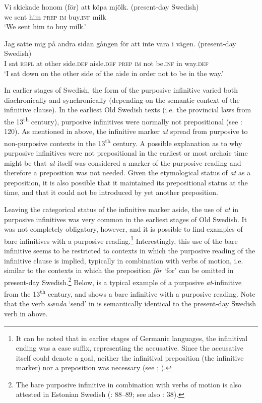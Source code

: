 \documentclass[output=paper]{langscibook}
\begin{document}
\ea
\label{ex:kalm:8}
\ea \label{ex:kalm:8a}
\gll Vi skickade honom (för) att köpa mjölk. (present-day Swedish)\\
we sent him \textsc{prep} \textsc{im} buy.\textsc{inf} milk\\
\glt ‘We sent him to buy milk.’

\ex  \label{ex:kalm:8b}
\gll Jag satte mig på andra sidan gången för att inte vara i vägen. (present-day Swedish)\\
 I sat \textsc{refl} at other side.\textsc{def} aisle.\textsc{def} \textsc{prep} \textsc{im} not be.\textsc{inf} in way.\textsc{def}\\
\glt ‘I sat down on the other side of the aisle in order not to be in the way.’
\z 
\z 


In earlier stages of Swedish, the form of the purposive infinitive varied both diachronically and synchronically (depending on the semantic context of the infinitive clause). In the earliest Old Swedish texts (i.e. the provincial laws from the 13\textsuperscript{th} century), purposive infinitives were normally not prepositional (see \citealt{Kalm2016Satsekvivalenta}: 120). As mentioned in  above, the infinitive marker \textit{at} spread from purposive to non-purposive contexts in the 13\textsuperscript{th} century. A possible explanation as to why purposive infinitives were not prepositional in the earliest or most archaic time might be that \textit{at} itself was considered a marker of the purposive reading and therefore a preposition was not needed. Given the etymological status of \textit{at} as a preposition, it is also possible that it maintained its prepositional status at the time, and that it could not be introduced by yet another preposition. 



Leaving the categorical status of the infinitive marker aside, the use of \textit{at} in purposive infinitives was very common in the earliest stages of Old Swedish. It was not completely obligatory, however, and it is possible to find examples of bare infinitives with a purposive reading.\footnote{It can be noted that in earlier stages of Germanic languages, the infinitival ending was a case suffix, representing the accusative. Since the accusative itself could denote a goal, neither the infinitival preposition (the infinitive marker) nor a preposition was necessary (see \citealt{Haspelmath1989}; \citealt{Jeffers1975}).} Interestingly, this use of the bare infinitive seems to be restricted to contexts in which the purposive reading of the infinitive clause is implied, typically in combination with verbs of motion, i.e. similar to the contexts in which the preposition \textit{för} ‘for’ can be omitted in present-day Swedish.\footnote{The bare purposive infinitive in combination with verbs of motion is also attested in Estonian Swedish (\citealt{Lagman1958}: 88–89; see also \citealt{Jorgensen1970}: 38).}  Below,  is a typical example of a purposive \textit{at}-infinitive from the 13\textsuperscript{th} century, and  shows a bare infinitive with a purposive reading. Note that the verb \textit{sænda} ‘send’ in  is semantically identical to the present-day Swedish verb in  above. 
\end{document}
